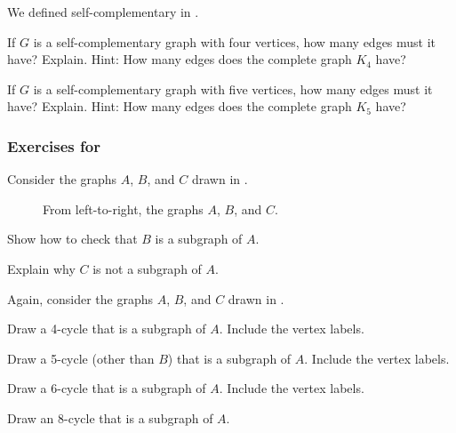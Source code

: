 \begin{exer}[\exerE] %
\label{exer_edges_selfcomp_graphs}  
    We defined self-complementary in .
        \begin{exerpart}
            \item If $G$ is a self-complementary graph with four vertices, how many edges must it have? Explain. Hint: How many edges does the complete graph $K_4$ have?
            \item If $G$ is a self-complementary graph with five vertices, how many edges must it have? Explain. Hint: How many edges does the complete graph $K_5$ have?
        \end{exerpart}
\end{exer}


\subsubsection*{Exercises for 
\subgraphtrees}

\begin{exer}[\exerP] %
\label{exer_subgraphs}
   Consider the graphs $A$, $B$, and $C$ drawn in .
       \begin{figure}[hbtp]
           \centering
           
           \caption{From left-to-right, the graphs  $A$, $B$, and $C$. }
           \label{fig_C8_plus_edges}
       \end{figure}
        \begin{exerpart}
            \item Show how to check that $B$ is a subgraph of $A$.
            \item Explain why $C$ is not a subgraph of $A$.  
        \end{exerpart}
\end{exer}

\begin{exer}[\exerP] %
\label{exer_cyclic_subgraphs}
    Again, consider the graphs $A$, $B$, and $C$ drawn in .
        \begin{exerpart}
            \item Draw a 4-cycle that is a subgraph of $A$.  Include the vertex labels. 
            \item Draw a 5-cycle (other than $B$) that is a subgraph of $A$.  Include the vertex labels.
            \item Draw a 6-cycle that is a subgraph of $A$.  Include the vertex labels.  
            \item Draw an 8-cycle that is a subgraph of $A$.
        \end{exerpart}
\end{exer}     

